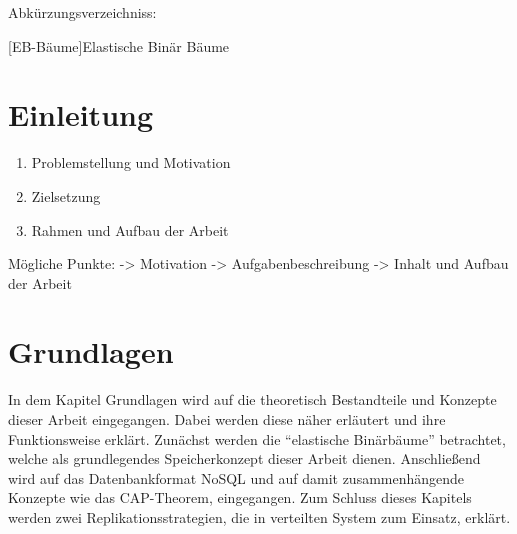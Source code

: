 \documentclass[a4paper,11pt,oneside,%
headsepline,												%
footsepline,												%
bibtotocnumbered									%
]{scrreprt}
\begin{document}
\tableofcontents
\newpage
Abkürzungsverzeichniss:\\
\begin{acronym}[EB-Baum] %
 	[EB-Bäume]{Elastische Binär Bäume}
\end{acronym}
\renewcommand\listoflistingscaption{Verzeichnis aller Codebeispiele}
\listoflistings

\chapter{Einleitung}
 		\begin{enumerate}[1.]
			\item  Problemstellung und Motivation
			\item Zielsetzung
			\item Rahmen und Aufbau der Arbeit
		\end{enumerate}
		
	Mögliche Punkte:
	-> Motivation
	-> Aufgabenbeschreibung
	-> Inhalt und Aufbau der Arbeit	
		
\chapter{Grundlagen}

In dem Kapitel Grundlagen wird auf die theoretisch Bestandteile und Konzepte dieser Arbeit eingegangen. Dabei werden diese näher erläutert und ihre Funktionsweise erklärt.
Zunächst werden die \enquote{elastische Binärbäume} betrachtet, welche als grundlegendes Speicherkonzept dieser Arbeit dienen. Anschließend wird auf das Datenbankformat NoSQL und auf damit zusammenhängende Konzepte wie das CAP-Theorem, eingegangen. Zum Schluss dieses Kapitels werden zwei Replikationsstrategien, die in verteilten System zum Einsatz, erklärt.   
\end{document}
